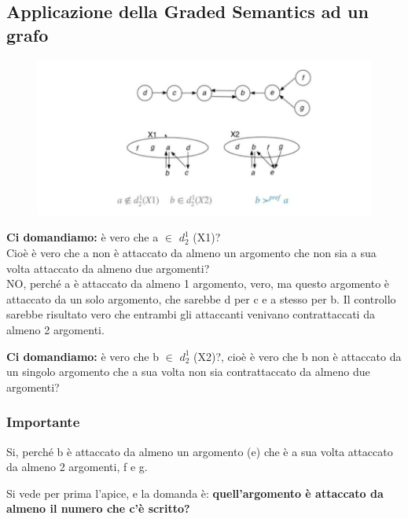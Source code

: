     \subsection{Applicazione della Graded Semantics ad un grafo}
    \begin{figure}[htp]
        \centering
        \includegraphics[width=13cm, keepaspectratio]{img/Cap8/GdefnseGrafo.png}
    \end{figure}
    \noindent \textbf{Ci domandiamo:} è vero che a $\in$ $d^1_2$ (X1)? \\Cioè è
    vero che a non è attaccato da almeno un argomento che non sia a sua volta
    attaccato da almeno due argomenti? \\NO, perché a è attaccato da almeno 1
    argomento, vero, ma questo argomento è attaccato da un solo argomento, che
    sarebbe d per c e a stesso per b. Il controllo sarebbe risultato vero che
    entrambi gli attaccanti venivano contrattaccati da almeno 2 argomenti.

    \vspace{0.4cm}

    \noindent \textbf{Ci domandiamo:} è vero che b $\in$ $d^1_2$ (X2)?, cioè è
    vero che b non è attaccato da un singolo argomento che a sua volta non sia
    contrattaccato da almeno due argomenti?

    \subsubsection{\textbf{Importante}} Si, perché b è attaccato da almeno un
    argomento (e) che è a sua volta attaccato da almeno 2 argomenti, f e g.

    \vspace{0.3cm}

    \noindent Si vede per prima l'apice, e la domanda è: \textbf{quell'argomento
        è attaccato da almeno il numero che c'è scritto?}

